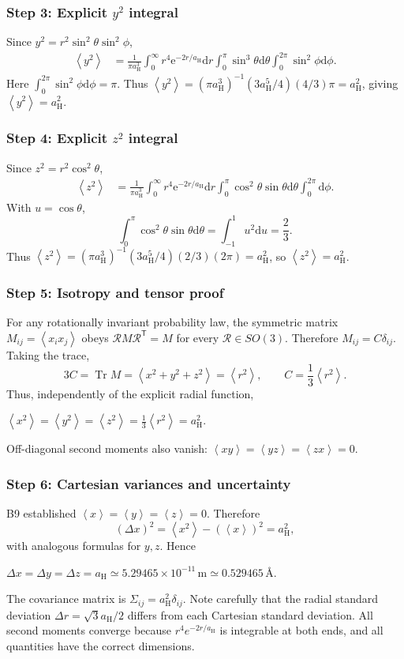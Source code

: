 \documentclass[11pt,a4paper]{article}
\newcommand{\key}[1]{\begin{resultbox}\centering\(\displaystyle #1\)\end{resultbox}}
\newcommand{\dd}{\mathrm{d}}
\newcommand{\ee}{\mathrm{e}}
\newcommand{\avg}[1]{\left\langle #1\right\rangle}
\newcommand{\aH}{a_{\mathrm H}}
\begin{document}
\subsubsection*{Step 3: Explicit \texorpdfstring{$y^2$}{y2} integral}
Since \(y^2=r^2\sin^2\theta\sin^2\phi\),
\begin{align}
\avg{y^2}&=\frac1{\pi\aH^3}\int_0^\infty r^4\ee^{-2r/\aH}\dd r\int_0^\pi\sin^3\theta\dd\theta\int_0^{2\pi}\sin^2\phi\dd\phi.
\end{align}
Here \(\int_0^{2\pi}\sin^2\phi\dd\phi=\pi\). Thus \(\avg{y^2}=(\pi\aH^3)^{-1}(3\aH^5/4)(4/3)\pi=\aH^2\), giving \(\boxed{\avg{y^2}=\aH^2}\).

\subsubsection*{Step 4: Explicit \texorpdfstring{$z^2$}{z2} integral}
Since \(z^2=r^2\cos^2\theta\),
\begin{align}
\avg{z^2}&=\frac1{\pi\aH^3}\int_0^\infty r^4\ee^{-2r/\aH}\dd r\int_0^\pi\cos^2\theta\sin\theta\dd\theta\int_0^{2\pi}\dd\phi.
\end{align}
With \(u=\cos\theta\),
\begin{equation}\int_0^\pi\cos^2\theta\sin\theta\dd\theta=\int_{-1}^1u^2\dd u=\frac23.\end{equation}
Thus \(\avg{z^2}=(\pi\aH^3)^{-1}(3\aH^5/4)(2/3)(2\pi)=\aH^2\), so \(\boxed{\avg{z^2}=\aH^2}\).

\subsubsection*{Step 5: Isotropy and tensor proof}
For any rotationally invariant probability law, the symmetric matrix \(M_{ij}=\avg{x_ix_j}\) obeys \(\mathcal R M\mathcal R^\mathsf T=M\) for every \(\mathcal R\in SO(3)\). Therefore \(M_{ij}=C\delta_{ij}\). Taking the trace,
\begin{equation}3C=\operatorname{Tr}M=\avg{x^2+y^2+z^2}=\avg{r^2},\qquad C=\frac13\avg{r^2}.\end{equation}
Thus, independently of the explicit radial function,
\key{\boxed{\avg{x^2}=\avg{y^2}=\avg{z^2}=\frac13\avg{r^2}=\aH^2.}}
Off-diagonal second moments also vanish: \(\avg{xy}=\avg{yz}=\avg{zx}=0\).

\subsubsection*{Step 6: Cartesian variances and uncertainty}
B9 established \(\avg x=\avg y=\avg z=0\). Therefore
\begin{equation}(\Delta x)^2=\avg{x^2}-(\avg x)^2=\aH^2,\end{equation}
with analogous formulas for \(y,z\). Hence
\key{\boxed{\Delta x=\Delta y=\Delta z=\aH\simeq5.29465\times10^{-11}\,\mathrm m\simeq0.529465\,\text{\AA}.}}
The covariance matrix is \(\Sigma_{ij}=\aH^2\delta_{ij}\). Note carefully that the radial standard deviation \(\Delta r=\sqrt3\aH/2\) differs from each Cartesian standard deviation. All second moments converge because \(r^4e^{-2r/\aH}\) is integrable at both ends, and all quantities have the correct dimensions.
\end{document}
